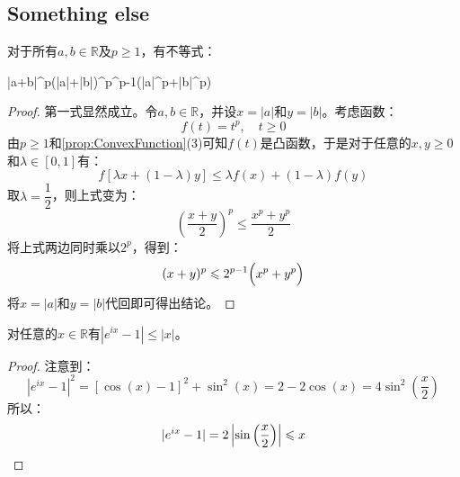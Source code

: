 \subsection{Something else}
\begin{theorem}
	对于所有$a,b\in\mathbb{R}$及$p\geqslant1$，有不等式：
	\begin{inequality*}\label{ineq:else1}
		|a+b|^p\leqslant\Bigl(|a|+|b|\Bigr)^p^{p-1}\Bigl(|a|^p+|b|^p\Bigr)
	\end{inequality*}
\end{theorem}
\begin{proof}
	第一式显然成立。令$a,b\in\mathbb{R}$，并设$x=|a|$和$y=|b|$。考虑函数：
	\begin{equation*}
		f(t)=t^p,\quad t\geqslant0
	\end{equation*}
	由$p\geqslant1$和\cref{prop:ConvexFunction}(3)可知$f(t)$是凸函数，于是对于任意的$x,y\geqslant0$和$\lambda\in[0,1]$有：
	\begin{equation*}
		f[\lambda x+(1-\lambda)y]\leqslant\lambda f(x)+(1-\lambda)f(y)
	\end{equation*}
	取$\lambda=\dfrac{1}{2}$，则上式变为：
	\begin{equation*}
		\left(\frac{x+y}{2}\right)^p\leqslant\frac{x^p+y^p}{2}
	\end{equation*}
	将上式两边同时乘以$2^p$，得到：
	\begin{equation*}
		(x+y)^p\leqslant2^{p-1}\Bigl(x^p+y^p\Bigr)
	\end{equation*}
	将$x=|a|$和$y=|b|$代回即可得出结论。
\end{proof}
\begin{theorem}\label{theo:ExpMinus1Bound}
	对任意的$x\in\mathbb{R}$有$|e^{ix}-1|\leqslant|x|$。
\end{theorem}
\begin{proof}
	注意到：
	\begin{equation*}
		|e^{ix}-1|^2=[\cos(x)-1]^2+\sin^2(x)=2-2\cos(x)=4\sin^2\left(\frac{x}{2}\right)
	\end{equation*}
	所以：
	\begin{equation*}
		|e^{ix}-1|=2\left|\sin\left(\frac{x}{2}\right)\right|\leqslant x\qedhere
	\end{equation*}
\end{proof}
